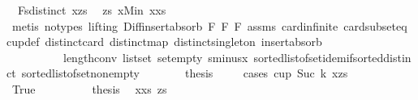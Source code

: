\begin{isabellebody}
\ \ F{}{\isacharcolon}{\kern0pt}{\isachardoublequoteopen}sdistinct\ {\isacharparenleft}{\kern0pt}x{\isacharhash}{\kern0pt}zs{\isacharparenright}{\kern0pt}{\isachardoublequoteclose}\ \isamarkupfalse%
\ zs\ x{\isacharunderscore}{\kern0pt}Min\ x{\isacharunderscore}{\kern0pt}xs\isanewline
\ \ \ \ \ \ \isamarkupfalse%
\ {\isacharparenleft}{\kern0pt}metis\ {\isacharparenleft}{\kern0pt}no{\isacharunderscore}{\kern0pt}types{\isacharcomma}{\kern0pt}\ lifting{\isacharparenright}{\kern0pt}\ Diff{\isacharunderscore}{\kern0pt}insert{\isacharunderscore}{\kern0pt}absorb\ F{}\ F{}\ F{}\ assms{\isacharparenleft}{\kern0pt}{}{\isacharparenright}{\kern0pt}\ card{\isachardot}{\kern0pt}infinite\ card{\isacharunderscore}{\kern0pt}subset{\isacharunderscore}{\kern0pt}eq\ cup{\isacharunderscore}{\kern0pt}def\ distinct{\isacharunderscore}{\kern0pt}card\ distinct{\isacharunderscore}{\kern0pt}map\ distinct{\isacharunderscore}{\kern0pt}singleton\ insert{\isacharunderscore}{\kern0pt}absorb\isanewline
\ \ \ \ \ \ \ \ \ \ length{\isacharunderscore}{\kern0pt}{}{\isacharunderscore}{\kern0pt}conv\ list{\isachardot}{\kern0pt}set{\isacharparenleft}{\kern0pt}{}{\isacharparenright}{\kern0pt}\ set{\isacharunderscore}{\kern0pt}empty{}\ sminus{\isacharunderscore}{\kern0pt}x\ sorted{\isacharunderscore}{\kern0pt}list{\isacharunderscore}{\kern0pt}of{\isacharunderscore}{\kern0pt}set{\isachardot}{\kern0pt}idem{\isacharunderscore}{\kern0pt}if{\isacharunderscore}{\kern0pt}sorted{\isacharunderscore}{\kern0pt}distinct\ sorted{\isacharunderscore}{\kern0pt}list{\isacharunderscore}{\kern0pt}of{\isacharunderscore}{\kern0pt}set{\isacharunderscore}{\kern0pt}nonempty{\isacharparenright}{\kern0pt}\isanewline
\ \ \ \ \isamarkupfalse%
\ \isamarkupfalse%
\ {\isacharquery}{\kern0pt}thesis\isanewline
\ \ \ \ \isamarkupfalse%
{\isacharparenleft}{\kern0pt}cases\ {\isachardoublequoteopen}cup\ {\isacharparenleft}{\kern0pt}Suc\ k{\isacharparenright}{\kern0pt}\ {\isacharparenleft}{\kern0pt}x{\isacharhash}{\kern0pt}zs{\isacharparenright}{\kern0pt}{\isachardoublequoteclose}{\isacharparenright}{\kern0pt}\isanewline
\ \ \ \ \ \ \isamarkupfalse%
\ True\isanewline
\ \ \ \ \ \ \isamarkupfalse%
\ \isamarkupfalse%
\ {\isacharquery}{\kern0pt}thesis\ \isamarkupfalse%
\ x{\isacharunderscore}{\kern0pt}xs{\isacharparenleft}{\kern0pt}{}{\isacharparenright}{\kern0pt}\ zs{\isacharparenleft}{\kern0pt}{}{\isacharparenright}{\kern0pt}\isanewline

\end{isabellebody}
